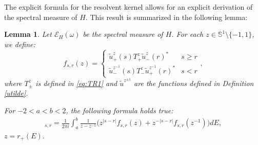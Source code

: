 \documentclass[12pt,oneside,onecolumn,open]{article}
\newtheorem{lema}[teo]{Lemma}
\begin{document}


The explicit formula for the resolvent kernel allows for an explicit derivation of the spectral measure of $H$. This result is summarized in the following lemma:
 
\begin{lema}
  Let \(\mathcal{E}_{H}(\omega)\) be the spectral measure of \(H\). 
For each \( z \in \mathbb{S}^1 \setminus \{-1, 1\} \), we define:
\begin{equation}\label{qwe}
   f_{s,r}(z)=
 \left\{ \begin{array}{lcc}
          \tilde{u}_{+}^{z}(s)T_{+}^{z} \tilde{u}_{-}^{z}(r)^{*}&   s\geq r \\
  \tilde{u}_- ^{z^{-1}}(s)T_-^{z}\tilde{u}_+^{z^{-1}}(r)^{*}&  s < r
             \end{array} ,
   \right.
   \end{equation}     
   where $T_\pm ^{z}$ is defined in  \eqref{eq:TR1} and $\tilde{u}^{z^{\pm 1}}$ are the functions defined in Definition \ref{utilde}.    
      
    For $-2<a<b<2$, the following formula holds true:
    \begin{align}
       [\mathcal{E}_{H}(a,b) ]_{s,r} =  \frac{1}{2 \pi i}\int_{a}^{b}  \frac{ 1 }{ z - z^{-1} }  \Big ( z^{|s-r|} f_{s, r}(z)  + z^{-|s-r|} f_{s, r}(z^{-1}) \Big )  dE ,
    \end{align}
$  z = r_+(E) .$
\end{lema}
 
\end{document}
